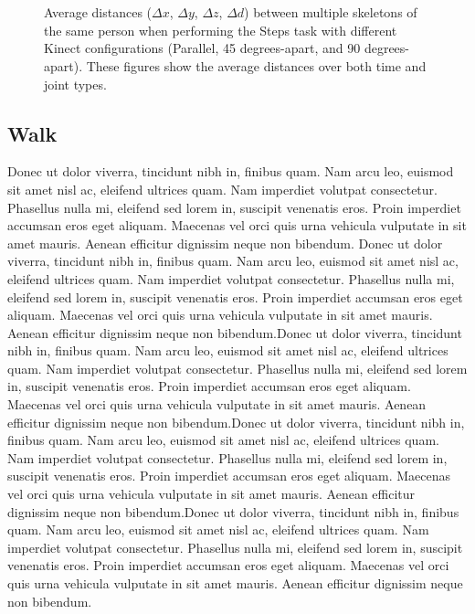 \documentclass{sigchi}
\begin{document}
\begin{figure}
  \centering

   \\
   \\
  

  \caption{Average distances ($\Delta x$, $\Delta y$, $\Delta z$, $\Delta d$) between multiple skeletons
    of the same person when performing the Steps task with different Kinect configurations
    (Parallel, 45 degrees-apart, and 90 degrees-apart). These figures show the average distances over both
    time and joint types.}

  \label{fig:results_steps_3d}
\end{figure}

\subsection{Walk}

Donec ut dolor viverra, tincidunt nibh in, finibus quam. Nam arcu leo, euismod sit amet nisl ac, eleifend ultrices quam. Nam imperdiet volutpat consectetur. Phasellus nulla mi, eleifend sed lorem in, suscipit venenatis eros. Proin imperdiet accumsan eros eget aliquam. Maecenas vel orci quis urna vehicula vulputate in sit amet mauris. Aenean efficitur dignissim neque non bibendum.
Donec ut dolor viverra, tincidunt nibh in, finibus quam. Nam arcu leo, euismod sit amet nisl ac, eleifend ultrices quam. Nam imperdiet volutpat consectetur. Phasellus nulla mi, eleifend sed lorem in, suscipit venenatis eros. Proin imperdiet accumsan eros eget aliquam. Maecenas vel orci quis urna vehicula vulputate in sit amet mauris. Aenean efficitur dignissim neque non bibendum.Donec ut dolor viverra, tincidunt nibh in, finibus quam. Nam arcu leo, euismod sit amet nisl ac, eleifend ultrices quam. Nam imperdiet volutpat consectetur. Phasellus nulla mi, eleifend sed lorem in, suscipit venenatis eros. Proin imperdiet accumsan eros eget aliquam. Maecenas vel orci quis urna vehicula vulputate in sit amet mauris. Aenean efficitur dignissim neque non bibendum.Donec ut dolor viverra, tincidunt nibh in, finibus quam. Nam arcu leo, euismod sit amet nisl ac, eleifend ultrices quam. Nam imperdiet volutpat consectetur. Phasellus nulla mi, eleifend sed lorem in, suscipit venenatis eros. Proin imperdiet accumsan eros eget aliquam. Maecenas vel orci quis urna vehicula vulputate in sit amet mauris. Aenean efficitur dignissim neque non bibendum.Donec ut dolor viverra, tincidunt nibh in, finibus quam. Nam arcu leo, euismod sit amet nisl ac, eleifend ultrices quam. Nam imperdiet volutpat consectetur. Phasellus nulla mi, eleifend sed lorem in, suscipit venenatis eros. Proin imperdiet accumsan eros eget aliquam. Maecenas vel orci quis urna vehicula vulputate in sit amet mauris. Aenean efficitur dignissim neque non bibendum.
\end{document}
